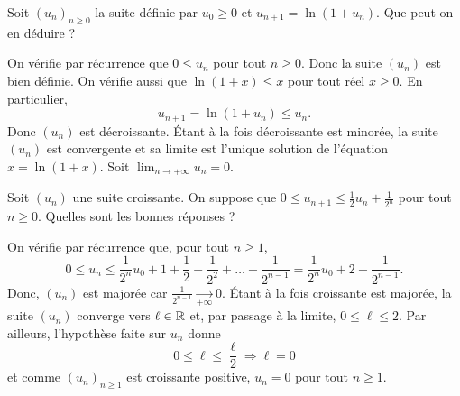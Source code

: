 \begin{question}

Soit $(u_n)_{n\geq 0}$ la suite définie par $u_0\geq 0$ et $\displaystyle u_{n+1}= \ln(1+u_n)$. Que peut-on en déduire ?
\begin{answers}  
\end{answers}
\begin{explanations}
On vérifie par récurrence que $\displaystyle 0\leq u_n$ pour tout $n\geq 0$. Donc la suite $(u_n)$ est bien définie. On vérifie aussi que $\ln (1+x)\leq x$ pour tout réel $x\geq 0$. En particulier, 
$$u_{n+1}=\ln (1+u_n)\leq u_n.$$
Donc $(u_n)$ est décroissante. Étant à la fois décroissante est minorée, la suite $(u_n)$ est convergente et sa limite est l'unique solution de l'équation $x=\ln (1+x)$. Soit $\displaystyle \lim _{n\to +\infty}u_n=0$.
\end{explanations}
\end{question}



\begin{question}

Soit $(u_n)$ une suite croissante. On suppose que $\displaystyle 0\leq u_{n+1}\leq \frac{1}{2}u_n+\frac{1}{2^n}$ pour tout $n\geq 0$. Quelles sont les bonnes réponses ?
\begin{answers} 
\end{answers}
\begin{explanations}
On vérifie par récurrence que, pour tout $n\geq 1$, 
$$\displaystyle 0\leq u_n\leq \frac{1}{2^n}u_0+1+\frac{1}{2}+\frac{1}{2^2}+\dots +\frac{1}{2^{n-1}}=\frac{1}{2^n}u_0+2-\frac{1}{2^{n-1}}.$$
Donc, $(u_n)$ est majorée car $\displaystyle \frac{1}{2^{n-1}}\underset{+\infty}{\longrightarrow}0$. \'Etant à la fois croissante est majorée, la suite $(u_n)$ converge vers $\ell \in \mathbb{R}$ et, par passage à la limite, $\displaystyle 0\leq \ell\leq 2$. Par ailleurs, l'hypothèse faite sur $u_n$ donne
$$0\leq \ell \leq \frac{\ell}{2} \Rightarrow \ell =0$$
et comme $(u_n)_{n\geq 1}$ est croissante positive, $u_n=0$ pour tout $n\geq 1$.
\end{explanations}
\end{question}



